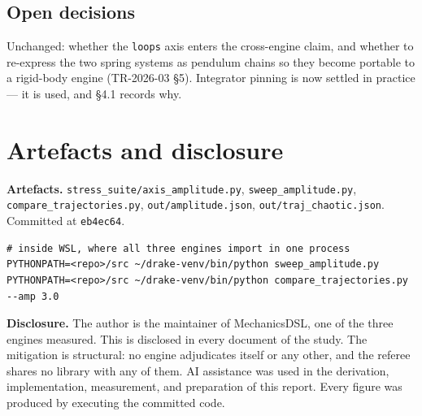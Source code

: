 \documentclass[11pt,a4paper]{article}
\newcommand{\gitsha}[1]{\texttt{#1}}
\begin{document}
\subsection{Open decisions}

Unchanged: whether the \texttt{loops} axis enters the cross-engine claim, and
whether to re-express the two spring systems as pendulum chains so they become
portable to a rigid-body engine (TR-2026-03 \S5). Integrator pinning is now
settled in practice --- it is used, and \S4.1 records why.

\section{Artefacts and disclosure}\label{sec:disclosure}

\noindent\textbf{Artefacts.} \texttt{stress\_suite/axis\_amplitude.py},
\texttt{sweep\_amplitude.py}, \texttt{compare\_trajectories.py},
\texttt{out/amplitude.json}, \texttt{out/traj\_chaotic.json}. Committed at
\gitsha{eb4ec64}.

\begin{lstlisting}
# inside WSL, where all three engines import in one process
PYTHONPATH=<repo>/src ~/drake-venv/bin/python sweep_amplitude.py
PYTHONPATH=<repo>/src ~/drake-venv/bin/python compare_trajectories.py --amp 3.0
\end{lstlisting}

\noindent\textbf{Disclosure.} The author is the maintainer of MechanicsDSL, one
of the three engines measured. This is disclosed in every document of the
study. The mitigation is structural: no engine adjudicates itself or any other,
and the referee shares no library with any of them. AI assistance was used in
the derivation, implementation, measurement, and preparation of this report.
Every figure was produced by executing the committed code.
\end{document}
